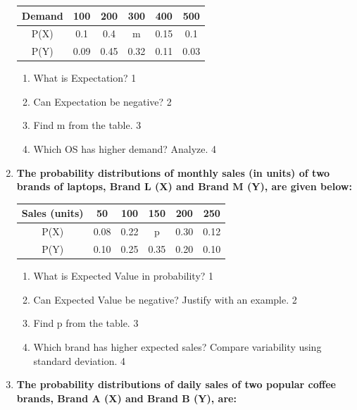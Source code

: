 \documentclass[a4paper,oneside, margin=1.4in]{book}
\begin{document}
\begin{enumerate}
	    \begin{table}[h]
	    	  \begin{center}
\begin{tabular}{c|c|c|c|c|c}
Demand & 100  & 200  & 300  & 400  & 500  \\ \hline
P(X)   & 0.1  & 0.4  & m    & 0.15 & 0.1  \\ \hline
P(Y)   & 0.09 & 0.45 & 0.32 & 0.11 & 0.03
\end{tabular}
	  \end{center}
\end{table}
  
  \begin{enumerate}
    \item
	What is Expectation? \hfill 1
    \item
	Can Expectation be negative? \hfill 2
    \item  
	Find m from the table. \hfill 3
    \item
	Which OS has higher demand? Analyze. \hfill 4
  \end{enumerate}
  
  \item
\textbf{The probability distributions of monthly sales (in units) of two brands of laptops, Brand L (X) and Brand M (Y), are given below:}

\begin{table}[h]
\centering
\begin{tabular}{c|c|c|c|c|c}
Sales (units) & 50  & 100 & 150 & 200 & 250 \\ \hline
P(X)          & 0.08 & 0.22 & p   & 0.30 & 0.12 \\ \hline
P(Y)          & 0.10 & 0.25 & 0.35 & 0.20 & 0.10
\end{tabular}
\end{table}

\begin{enumerate}
    \item
    What is Expected Value in probability? \hfill 1
    \item
    Can Expected Value be negative? Justify with an example. \hfill 2
    \item
    Find p from the table. \hfill 3
    \item
    Which brand has higher expected sales? Compare variability using standard deviation. \hfill 4
\end{enumerate}
  
  \item
	  \textbf{The probability distributions of daily sales of two popular coffee brands, Brand A (X) and Brand B (Y), are:} 
	  

\end{enumerate}
\end{document}
